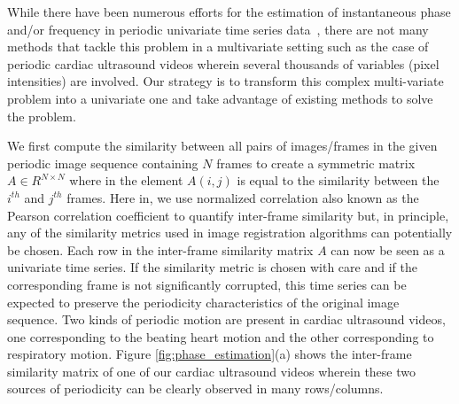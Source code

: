 \documentclass[runningheads,a4paper]{llncs}
\begin{document}
%
While there have been numerous efforts for the estimation of instantaneous phase and/or frequency in periodic univariate time series data~\cite{Boashash1992,Lu2013,Luo2003}, there are not many methods that tackle this problem in a multivariate setting such as the case of periodic cardiac ultrasound videos wherein several thousands of variables (pixel intensities) are involved. Our strategy is to transform this complex multi-variate problem into a univariate one and take advantage of existing methods to solve the problem. 

	We first compute the similarity between all pairs of images/frames in the given periodic image sequence containing $N$ frames to create a symmetric matrix $A \in R^{N \times N}$ where in the element $A(i,j)$ is equal to the similarity between the $i^{th}$ and $j^{th}$ frames. Here in, we use normalized correlation also known as the Pearson correlation coefficient to quantify inter-frame similarity but, in principle, any of the similarity metrics used in image registration algorithms can potentially be chosen. Each row in the inter-frame similarity matrix $A$ can now be seen as a univariate time series. If the similarity metric is chosen with care and if the corresponding frame is not significantly corrupted, this time series can be expected to preserve the periodicity characteristics of the original image sequence. Two kinds of periodic motion are present in cardiac ultrasound videos, one corresponding to the beating heart motion and the other corresponding to respiratory motion. Figure \ref{fig:phase_estimation}(a) shows the inter-frame similarity matrix of one of our cardiac ultrasound videos wherein these two sources of periodicity can be clearly observed in many rows/columns. 
\end{document}
